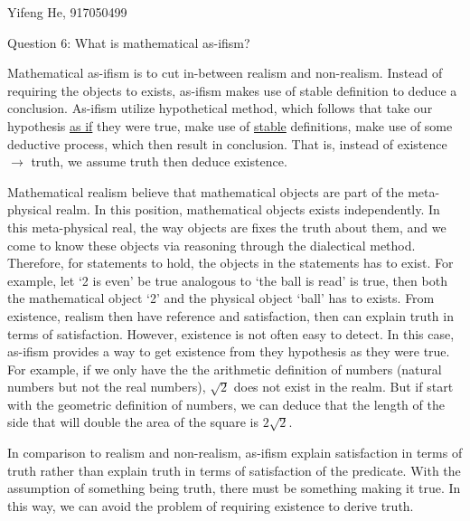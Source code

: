 \documentclass[11pt]{article}
\begin{document}
\begin{center}
    Yifeng He, 917050499
\end{center}

\begin{center}
    Question 6: What is mathematical as-ifism?
\end{center}

Mathematical as-ifism is to cut in-between realism and non-realism.
Instead of requiring the objects to exists,
as-ifism makes use of stable definition to deduce a conclusion.
As-ifism utilize hypothetical method, which follows that
take our hypothesis \underline{as if} they were true,
make use of \underline{stable} definitions,
make use of some deductive process,
which then result in conclusion.
That is, instead of existence $\rightarrow$ truth,
we assume truth then deduce existence. 

Mathematical realism  believe that mathematical objects are part of the meta-physical realm.
In this position, mathematical objects exists independently.
In this meta-physical real, the way objects are fixes the truth about them,
and we come to know these objects via reasoning through the dialectical method.
Therefore, for statements to hold, the objects in the statements has to exist.
For example, let `2 is even' be true analogous to `the ball is read' is true,
then both the mathematical object `2' and the physical object `ball' has to exists.
From existence, realism then have reference and satisfaction,
then can explain truth in terms of satisfaction.
However, existence is not often easy to detect.
In this case, as-ifism provides a way to get existence from they hypothesis as they were true.
For example, if we only have the the arithmetic definition of numbers (natural numbers but not the real numbers),
$\sqrt{2}$ does not exist in the realm.
But if start with the geometric definition of numbers,
we can deduce that the length of the side that will double the area of the square is $2\sqrt{2}$.

In comparison to realism and non-realism,
as-ifism explain satisfaction in terms of truth
rather than explain truth in terms of satisfaction of the predicate.
With the assumption of something being truth,
there must be something making it true.
In this way, we can avoid the problem of requiring existence to derive truth.
\end{document}
